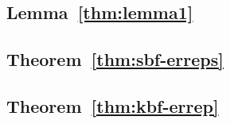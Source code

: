 \label{sec:keyless-proof}
\label{sec:proof/sbf-erreps}
\label{sec:proof/kbf-errep}

\subsection*{Lemma~\ref{thm:lemma1}}


\subsection*{Theorem~\ref{thm:sbf-erreps}}


\subsection*{Theorem~\ref{thm:kbf-errep}}

